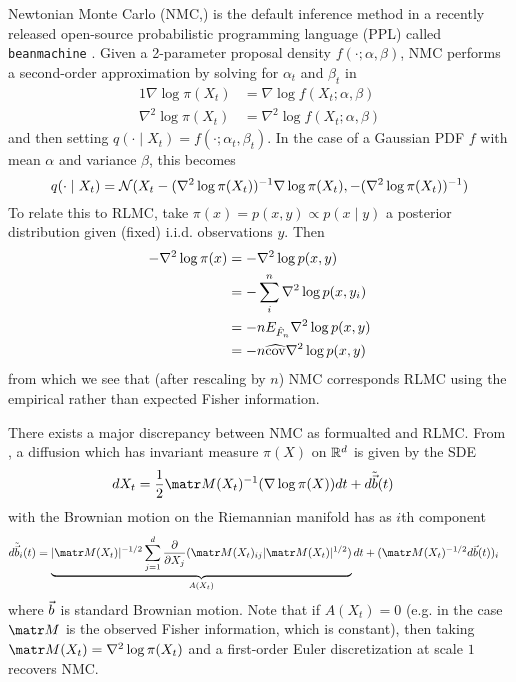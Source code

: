\documentclass{scrartcl}
\begin{document}
Newtonian Monte Carlo (NMC,\cite{arora2020newtonian}) is the default
inference method in a recently released open-source probabilistic programming
language (PPL) called \texttt{beanmachine} \citep{tehranibean}. Given
a 2-parameter proposal density $f(\cdot; \alpha, \beta)$, NMC performs a second-order approximation
by solving for $\alpha_t$ and $\beta_t$ in
\begin{alignat*}{1}
    \nabla \log \pi(X_t)   & = \nabla \log f(X_t; \alpha, \beta)   \\
    \nabla^2 \log \pi(X_t) & = \nabla^2 \log f(X_t; \alpha, \beta)
\end{alignat*}
and then setting $q(\cdot \mid X_t) = f(\cdot; \alpha_t, \beta_t)$. In the case of a Gaussian PDF $f$
with mean $\alpha$ and variance $\beta$, this becomes
\[
    q(\cdot \mid X_t)
    = \mathcal{N}(X_t - (\nabla^2 \log \pi(X_t))^{-1} \nabla \log \pi(X_t), -(\nabla^2 \log \pi(X_t))^{-1})
\]
To relate this to RLMC, take $\pi(x) = p(x, y) \propto p(x \mid y)$ a
posterior distribution given (fixed) i.i.d. observations $y$. Then
\begin{alignat*}{1}
    - \nabla^2 \log \pi(x)
     & = - \nabla^2 \log p(x, y)                 \\
     & = - \sum_i^n \nabla^2 \log p(x, y_i)      \\
     & = -n E_{\hat{F}_n} \nabla^2 \log p(x, y)  \\
     & = -n \widehat{\operatorname*{cov}} \nabla^2 \log p(x, y)
\end{alignat*}
from which we see that (after rescaling by $n$) NMC corresponds RLMC using the empirical
rather than expected Fisher information.


There exists a major discrepancy between NMC as formualted and RLMC. From \cite{roberts2002langevin},
a diffusion which has invariant measure $\pi(X)$ on $\mathbb{R}^d$ is given by the SDE
\begin{alignat}{1}
    dX_t & = \frac{1}{2} \mM(X_t)^{-1} (\nabla \log \pi(X)) dt + d\tilde{\vb}(t)
\end{alignat}
with the Brownian motion on the Riemannian manifold has as $i$th component
\begin{alignat}{1}
    d\tilde{\vb}_i(t)
     & = \underbrace{\lvert \mM(X_t) \rvert^{-1/2} \sum_{j=1}^d \frac{\pd}{\pd X_j} ( \mM(X_t)_{ij} \lvert \mM(X_t) \rvert^{1/2} )}_{A(X_t)} dt
    + (\mM(X_t)^{-1/2} d\vb(t))_i
\end{alignat}
where $\vec{b}$ is standard Brownian motion.
Note that if $A(X_t) = 0$ (e.g. in the case $\mM$ is the observed Fisher information, which is constant),
then taking $\mM(X_t) = \nabla^2 \log \pi(X_t)$ and a first-order Euler discretization
at scale $1$ recovers NMC.
\end{document}
